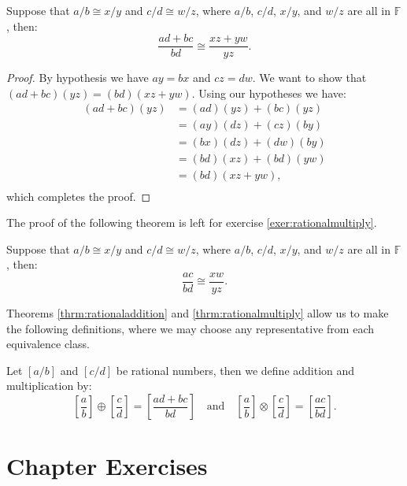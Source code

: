 \begin{thrm}\label{thrm:rationaladdition}
Suppose that $a/b\cong x/y$ and $c/d\cong w/z$, where $a/b$, $c/d$, $x/y$, and $w/z$ are all in $\mathbb F$, then: \[ \frac{ad+bc}{bd}\cong \frac{xz+yw}{
yz}.\]
\end{thrm}

\begin{proof}
By hypothesis we have $ay=bx$ and $cz=dw$. We want to show that $(ad+bc)(yz)=(bd)(xz+yw)$. Using our hypotheses we have:
\begin{equation*}
\begin{split}
(ad+bc)(yz)&=(ad)(yz)+(bc)(yz)\\
&=(ay)(dz)+(cz)(by)\\
&=(bx)(dz)+(dw)(by)\\
&=(bd)(xz)+(bd)(yw)\\
&=(bd)(xz+yw)\text{,}\\
\end{split}
\end{equation*}
which completes the proof.
\end{proof}

The proof of the following theorem is left for exercise \ref{exer:rationalmultiply}.

\begin{thrm}\label{thrm:rationalmultiply}
Suppose that $a/b\cong x/y$ and $c/d\cong w/z$, where $a/b$, $c/d$, $x/y$, and $w/z$ are all in $\mathbb F$, then: \[ \frac{ac}{bd}\cong \frac{xw}{yz}.\]
\end{thrm}

Theorems \ref{thrm:rationaladdition} and \ref{thrm:rationalmultiply} allow us to make the following definitions, where we may choose any representative from each equivalence class.

\begin{definition}
Let $[a/b]$ and $[c/d]$ be rational numbers, then we define addition and multiplication by:
\[\left[ \frac ab\right] \oplus \left[ \frac cd\right] =\left[ \frac{ad+bc}{bd} \right] \quad\text{and}\quad \left[ \frac ab\right] \otimes\left[ \frac cd\right] =\left[\frac{ac}{bd}\right]\text{.}\]
\end{definition}

\clearpage

\section*{Chapter  Exercises}
\anschapter

